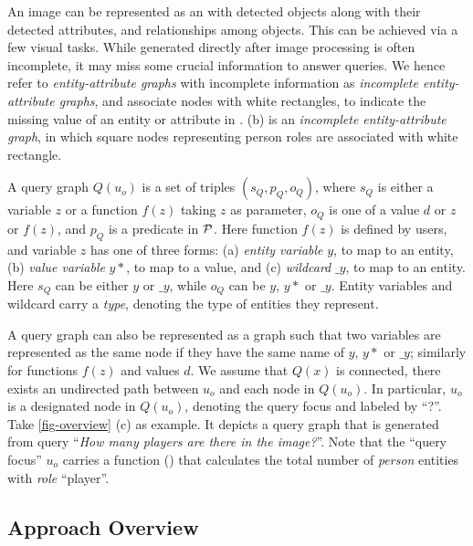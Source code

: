 An image can be represented as an  with detected objects along with their detected attributes, and relationships among objects. This can be achieved via a few visual tasks. While  generated directly after image processing is often incomplete, \ie it may miss some crucial information to answer queries. We hence refer to {\em entity-attribute graphs} with incomplete information as {\em incomplete entity-attribute graphs}, and associate nodes with white rectangles, to indicate the missing value of an entity or attribute in . (b) is an {\em incomplete entity-attribute graph}, in which square nodes representing person roles are associated with white rectangle. 

  A query graph $Q(u_o)$ is a set of triples
$(s_Q, p_Q, o_Q)$, where $s_Q$ is either a variable $z$ or a function $f(z)$ taking $z$ as parameter, $o_Q$ is one of a value $d$ or $z$ or $f(z)$, and $p_Q$ is a predicate in ${\cal P}$. Here function $f(z)$ is defined by users, and variable $z$ has one
of three forms: (a) {\em entity variable} $y$, to map to an entity, (b)
{\em value variable} $y*$, to map to a value, and (c) {\em wildcard} $\_y$, to
map to an entity. Here $s_Q$ can be either $y$ or $\_y$, while $o_Q$ can
be $y$, $y*$ or $\_y$. Entity variables and wildcard carry a {\em type},
denoting the type of entities they represent. 

A query graph can also be represented as a graph such
that two variables are represented as the same node if they
have the same name of $y$, $y*$ or $\_y$; similarly for functions $f(z)$ and values $d$.
We assume \kwlog that $Q(x)$ is connected, \ie there exists
an undirected path between $u_o$ and each node in $Q(u_o)$.
In particular, $u_o$ is a designated node in $Q(u_o)$, {\color{red}denoting the query focus and labeled by ``?''}. %
Take \cref{fig-overview} (c) as example. It depicts a query graph that is generated from query ``{\em How many players are there in the image?}''. Note that the ``query focus'' $u_o$ carries a function () that calculates the total number of {\em person} entities with {\em role} ``player''. 


\subsection{Approach Overview}
\label{sec-architecture}



